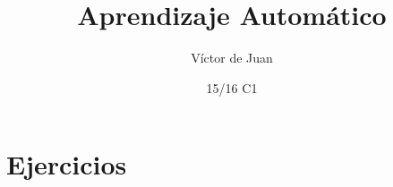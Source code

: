 \documentclass{apuntes}
\title{Aprendizaje Automático}
\author{Víctor de Juan}
\date{15/16 C1}
\begin{document}
\pagestyle{plain}
\maketitle

\tableofcontents
\newpage


\appendix

\chapter{Ejercicios}
\printindex
\end{document}
